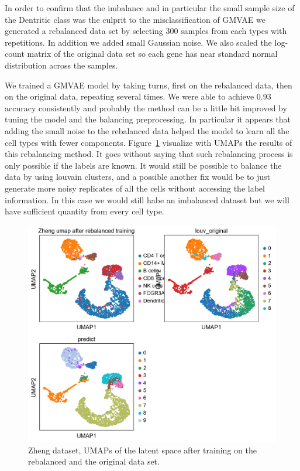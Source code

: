\documentclass[11pt, a4paper]{report}
\theoremstyle{plain}
\theoremstyle{definition}
\theoremstyle{remark}
\begin{document}
In order to confirm that the imbalance and in particular the small sample size
of the Dentritic class was the culprit to the misclassification of GMVAE we 
generated a rebalanced data set by selecting 
$300$ samples from each types with repetitions. In addition we added small
Gaussian noise. We also scaled the log-count matrix of the original data set 
so each gene has near standard normal distribution across the samples.

We trained a GMVAE model by taking turns, first on the rebalanced data, then on
the original data, repeating several times.
We were able to achieve 0.93 accuracy consistently and probably the method can
be a little bit improved by tuning the model and the balancing preprocessing.
In particular it appears that adding the small noise to the rebalanced data
helped the model to learn all the cell types with fewer components.
Figure~\ref{fig:zheng_ss_latent_balanced} visualize with UMAPs the results 
of this rebalancing method. It goes without saying that such rebalancing process
is only possible if the labels are known. It would still be possible to balance
the data by using louvain clusters, and a possible another fix would be to just
generate more noisy replicates of all the cells without accessing the label
information. In this case we would still habe an imbalanced dataset but we will
have sufficient quantity from every cell type.

\begin{figure}[h]
\centering
\includegraphics[width=1.1\textwidth]{images/gmmvae_zheng_us_balanced_10c_umap1.png}
\caption{Zheng dataset, UMAPs of the latent space after training 
on the rebalanced and the original data set.
}
\label{fig:zheng_ss_latent_balanced}
\end{figure}
\end{document}
